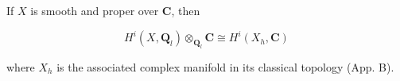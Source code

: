 If $X$ is smooth and proper over $\mathbf{C}$, then

$$H^i(X, \mathbf{Q}_l) \otimes_{\mathbf{Q}_l} \mathbf{C} \cong H^i(X_h, \mathbf{C})$$

where $X_h$ is the associated complex manifold in its classical topology (App. B).
